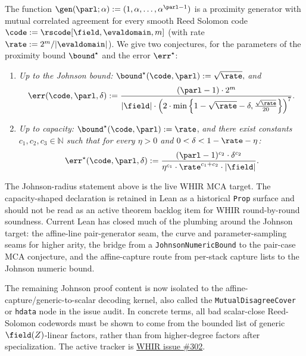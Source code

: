 \begin{theorem}\label{conjecture:whir}
    The function $\gen(\parl; \alpha) := (1, \alpha, \ldots, \alpha^{\parl - 1})$ is a proximity generator with mutual correlated agreement for every smooth Reed Solomon code $\code := \rscode[\field, \evaldomain, m]$ (with rate $\rate := 2^m / |\evaldomain|$). We give two conjectures, for the parameters of the proximity bound ${\bound}^\star$ and the error $\err^\star$:
    \begin{enumerate}
        \item \textit{Up to the Johnson bound:} ${\bound}^\star(\code, \parl) := \sqrt{\rate},$ \textit{and}
        \[
        \err(\code, \parl, \delta) := \frac{(\parl - 1) \cdot 2^m}{|\field| \cdot \left( 2 \cdot \min\left\{1 - \sqrt{\rate} - \delta, \frac{\sqrt{\rate}}{20} \right\} \right)^7}.
        \]
      
        \item \textit{Up to capacity:} ${\bound}^\star(\code, \parl) := \rate$, \textit{and there exist constants $c_1, c_2, c_3 \in \mathbb{N}$ such that for every $\eta > 0$ and $0 < \delta < 1 - \rate - \eta$:}
        \[
        \err^\star(\code, \parl, \delta) := \frac{(\parl - 1)^{c_2} \cdot \delta^{c_2}}{\eta^{c_1} \cdot \rate^{c_1 + c_2} \cdot |\field|}.
        \]
      \end{enumerate}
\end{theorem}

\begin{remark}\label{rem:whir_mca_status}
The Johnson-radius statement above is the live WHIR MCA target.  The
capacity-shaped declaration is retained in Lean as a historical \texttt{Prop}
surface and should not be read as an active theorem backlog item for WHIR
round-by-round soundness.  Current Lean has closed much of the plumbing around
the Johnson target: the affine-line pair-generator seam, the curve and
parameter-sampling seams for higher arity, the bridge from a
\texttt{JohnsonNumericBound} to the pair-case MCA conjecture, and the
affine-capture route from per-stack capture lists to the Johnson numeric bound.

The remaining Johnson proof content is now isolated to the
affine-capture/generic-to-scalar decoding kernel, also called the
\texttt{MutualDisagreeCover} or \texttt{hdata} node in the issue audit.  In
concrete terms, all bad scalar-close Reed-Solomon codewords must be shown to
come from the bounded list of generic \(\field(Z)\)-linear factors, rather than
from higher-degree factors after specialization.  The active tracker is
\href{https://github.com/lalalune/ArkLib/issues/302}{WHIR issue \#302}.
\end{remark}

